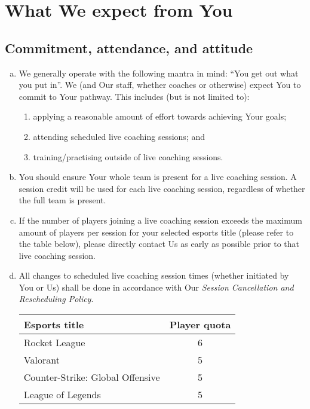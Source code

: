 \documentclass[10pt]{article}
\begin{document}
\section{What We expect from You}
\subsection{Commitment, attendance, and attitude}
\begin{enumerate}[(a)]
\item
We generally operate with the following mantra in mind: ``You get out what you put in''. We (and Our staff, whether coaches or otherwise) expect You to commit to Your pathway. This includes (but is not limited to):
\begin{enumerate}[(1)]
\item
applying a reasonable amount of effort towards achieving Your goals;

\item
attending scheduled live coaching sessions; and

\item
training/practising outside of live coaching sessions.
\end{enumerate}

\item
You should ensure Your whole team is present for a live coaching session. A session credit will be used for each live coaching session, regardless of whether the full team is present.

\item
If the number of players joining a live coaching session exceeds the maximum amount of players per session for your selected esports title (please refer to the table below), please directly contact Us as early as possible prior to that live coaching session.

\item
All changes to scheduled live coaching session times (whether initiated by You or Us) shall be done in accordance with Our \textit{Session Cancellation and Rescheduling Policy}.

\begin{tabular}{ |l|c| }
\hline
\textbf{Esports title} & \textbf{Player quota} \\
\hline
Rocket League & 6 \\
\hline
Valorant & 5 \\
\hline
Counter-Strike: Global Offensive & 5 \\
\hline
League of Legends & 5 \\
\hline
\end{tabular}
\end{enumerate}
\end{document}
